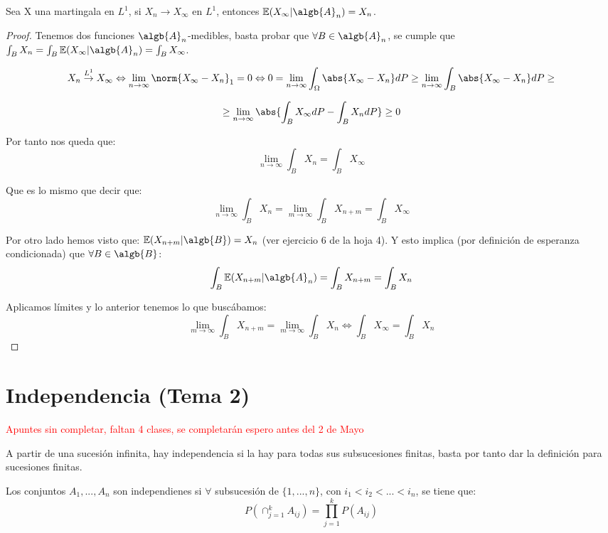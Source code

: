 \documentclass{apuntes}
\begin{document}
\begin{theorem}
Sea X una martingala en $L^1$, si $X_n \rightarrow X_{\infty}$ en $L^1$, entonces $\mathbb{E}(X_{\infty}|\algb{A}_n)=X_n$.
\end{theorem}
\begin{proof}
Tenemos dos funciones $\algb{A}_n$-medibles, basta probar que $\forall B \in \algb{A}_n$, se cumple que $\int_B X_n = \int_B \mathbb{E}(X_{\infty}|\algb{A}_n) = \int_B X_{\infty}$.

\[
X_n \stackrel{L^1}{\rightarrow} X_{\infty} \Leftrightarrow \lim_{n \rightarrow \infty} \norm{X_{\infty}-X_n}_1=0 \Leftrightarrow 0= \lim_{n \rightarrow \infty} \int_{\Omega}\abs{X_{\infty}-X_n}dP \geq \lim_{n \rightarrow \infty} \int_B \abs{X_{\infty}-X_n}dP\geq
\]

\[
\geq \lim_{n \rightarrow \infty} \abs{\int_B X_{\infty}dP- \int_B X_n dP} \geq 0
\]


Por tanto nos queda que:
\[
\lim_{n \rightarrow \infty} \int_B X_n = \int_B X_{\infty}
\]

Que es lo mismo que decir que:
\[
\lim_{n \rightarrow \infty} \int_B X_n = \lim_{m \rightarrow \infty} \int_B X_{n+m} = \int_B X_{\infty}
\]

Por otro lado hemos visto que: $\mathbb{E}(X_{n+m}|\algb{B}) = X_n$ (ver ejercicio 6 de la hoja 4). Y esto implica (por definición de esperanza condicionada) que $\forall B \in \algb{B}$:
\[
\int_B \mathbb{E}(X_{n+m}|\algb{A}_n)=\int_B X_{n+m} = \int_B X_n 
\]

Aplicamos límites y  lo anterior tenemos lo que buscábamos:
\[
\lim_{m \rightarrow \infty}\int_B X_{n+m} = \lim_{m \rightarrow \infty}\int_B X_{n} \Leftrightarrow \int_B X_{\infty} = \int_B X_n
\]

\end{proof}

\chapter{Independencia (Tema 2)} 

\textcolor{red}{Apuntes sin completar, faltan 4 clases, se completarán espero antes del 2 de Mayo}

A partir de una sucesión infinita, hay independencia si la hay para todas sus subsucesiones finitas, basta por tanto dar la definición para sucesiones finitas.

\begin{defn}
Los conjuntos $A_1,...,A_n$ son independienes si $\forall$ subsucesión de $\{1,...,n\}$, con $i_1 < i_2 < ... < i_n$, se tiene que:
\[
P(\cap_{j=1}^k A_{ij}) = \prod_{j=1}^{k}P(A_{ij})
\]
\end{defn}
\end{document}
